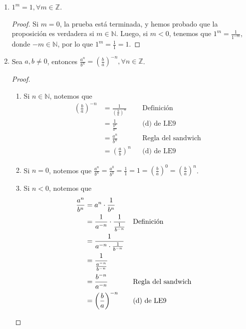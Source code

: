 \documentclass[11pt]{article}
\newcommand{\N}{\mathbb{N}}
\newcommand{\Z}{\mathbb{Z}}
\begin{document}
 \begin{enumerate}[label=\alph*)]
  \item $1^m = 1, \forall m\in \Z$. \begin{proof}
    Si $m=0$, la prueba está terminada, y hemos probado que la proposición es verdadera si $m\in \N$. Luego, si $m<0$, tenemos que $1^m = \frac{1}{1^{-m}}$, donde $-m\in \N$, por lo que $1^m = \frac{1}{1} = 1$.
  \end{proof}

  \item Sea $a,b\neq 0$, entonces $\frac{a^n}{b^n} = \left(\frac{b}{a}\right)^{-n}, \forall n\in \Z$.
  \begin{proof}\leavevmode
    \begin{enumerate}[label=\roman*)]
      \item Si $n\in \N$, notemos que \begin{align*}
        \left(\frac{b}{a}\right)^{-n} &= \frac{1}{\left(\frac{b}{a}\right)^n} && \text{Definición}\\
        &= \frac{1}{\frac{b^n}{a^n}} && \text{(d) de LE9}\\
        &= \frac{a^n}{b^n} && \text{Regla del sandwich}\\
        &= \left(\frac{a}{b}\right)^n && \text{(d) de LE9}
      \end{align*}
      \item Si $n=0$, notemos que $\frac{a^n}{b^n} = \frac{a^0}{b^0} = \frac{1}{1} = 1 = \left(\frac{b}{a}\right)^0 = \left(\frac{b}{a}\right)^n$.
      \item Si $n<0$, notemos que \begin{align*}
        \frac{a^n}{b^n} &= a^n \cdot \frac{1}{b^n}\\
        &= \frac{1}{a^{-n}} \cdot \frac{1}{\frac{1}{b^{-n}}} && \text{Definición}\\
        &= \frac{1}{a^{-n}\cdot \frac{1}{b^{-n}}}\\
        &= \frac{1}{\frac{a^{-n}}{b^{-n}}}\\
        &= \frac{b^{-n}}{a^{-n}} && \text{Regla del sandwich}\\
        &= \left(\frac{b}{a}\right)^{-n} && \text{(d) de LE9} \qedhere
      \end{align*}
    \end{enumerate}
  \end{proof}


\end{enumerate}
\end{document}
